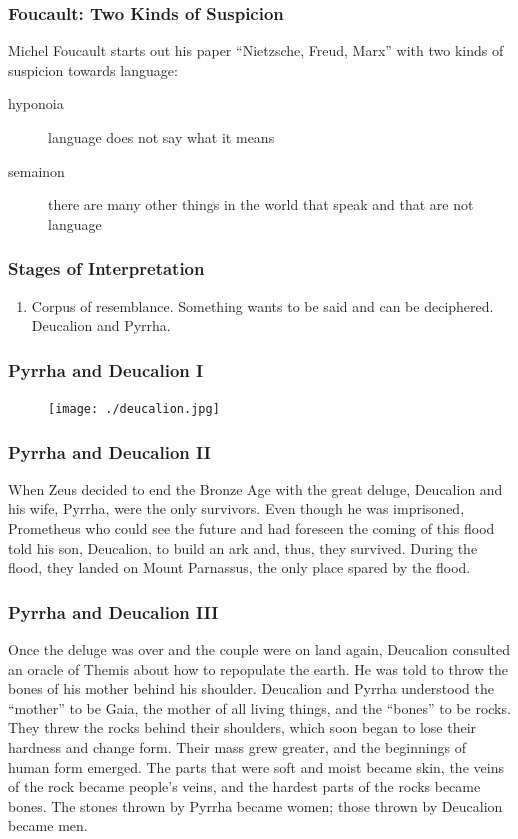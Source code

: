 \documentclass[xcolor=dvipsnames]{beamer}
\begin{document}
\begin{frame}
  \frametitle{Foucault: Two Kinds of Suspicion}
  Michel Foucault starts out his paper ``Nietzsche, Freud, Marx'' with
  two kinds of suspicion towards language:
  \begin{description}
  \item[hyponoia] language does not say what it means
  \item[semainon] there are many other things in the world that speak and that are not language
  \end{description}
\end{frame}

\begin{frame}
  \frametitle{Stages of Interpretation}
  \begin{enumerate}
  \item Corpus of resemblance. Something wants to be said and can be
    deciphered. Deucalion and Pyrrha. 
  \end{enumerate}
\end{frame}

\begin{frame}
  \frametitle{Pyrrha and Deucalion I}
      \begin{figure}[h]
    \texttt{[image: ./deucalion.jpg]}
  \end{figure}
\end{frame}

\begin{frame}
  \frametitle{Pyrrha and Deucalion II}
  When Zeus decided to end the Bronze Age with the great deluge,
  Deucalion and his wife, Pyrrha, were the only survivors. Even though
  he was imprisoned, Prometheus who could see the future and had
  foreseen the coming of this flood told his son, Deucalion, to build
  an ark and, thus, they survived. During the flood, they landed on
  Mount Parnassus, the only place spared by the flood.
\end{frame}

\begin{frame}
  \frametitle{Pyrrha and Deucalion III}
  Once the deluge was over and the couple were on land again,
  Deucalion consulted an oracle of Themis about how to repopulate the
  earth. He was told to throw the bones of his mother behind his
  shoulder. Deucalion and Pyrrha understood the ``mother'' to be Gaia,
  the mother of all living things, and the ``bones'' to be rocks. They
  threw the rocks behind their shoulders, which soon began to lose
  their hardness and change form. Their mass grew greater, and the
  beginnings of human form emerged. The parts that were soft and moist
  became skin, the veins of the rock became people's veins, and the
  hardest parts of the rocks became bones. The stones thrown by Pyrrha
  became women; those thrown by Deucalion became men.
\end{frame}
\end{document}
